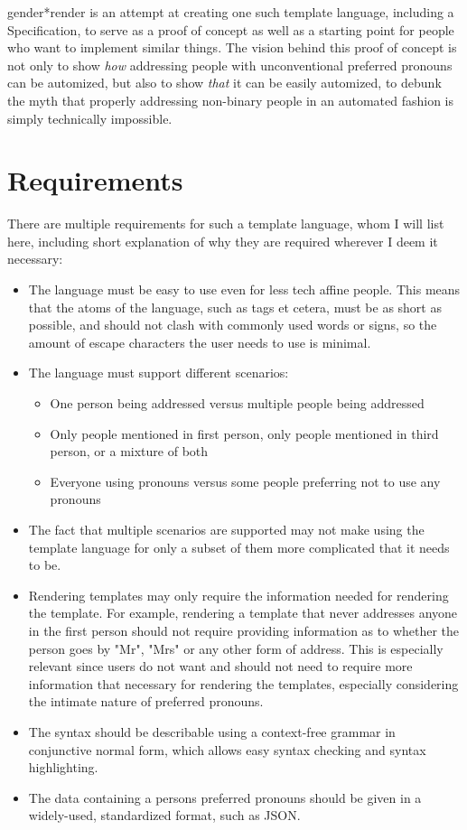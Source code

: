 \documentclass{article}
\newcommand{\GenderRender}{
    gender*render
}
\begin{document}
    \GenderRender is an attempt at creating one such template language, including a Specification, to serve as a proof of concept as well as a starting point for people who want to implement similar things.
    The vision behind this proof of concept is not only to show \emph{how} addressing people with unconventional preferred pronouns can be automized, but also to show \emph{that} it can be easily automized, to debunk the myth that properly addressing non-binary people in an automated fashion is simply technically impossible.

\section{Requirements}

    There are multiple requirements for such a template language, whom I will list here, including short explanation of why they are required wherever I deem it necessary:

    \begin{itemize}
        \item The language must be easy to use even for less tech affine people.
              This means that the atoms of the language, such as tags et cetera, must be as short as possible, and should not clash with commonly used words or signs, so the amount of escape characters the user needs to use is minimal.
        \item The language must support different scenarios:
        \begin{itemize}
            \item One person being addressed versus multiple people being addressed
            \item Only people mentioned in first person, only people mentioned in third person, or a mixture of both
            \item Everyone using pronouns versus some people preferring not to use any pronouns
        \end{itemize}
        \item The fact that multiple scenarios are supported may not make using the template language for only a subset of them more complicated that it needs to be.
        \item Rendering templates may only require the information needed for rendering the template.
        For example, rendering a template that never addresses anyone in the first person should not require providing information as to whether the person goes by "Mr", "Mrs" or any other form of address.
        This is especially relevant since users do not want and should not need to require more information that necessary for rendering the templates, especially considering the intimate nature of preferred pronouns.
        \item The syntax should be describable using a context-free grammar in conjunctive normal form, which allows easy syntax checking and syntax highlighting.
        \item The data containing a persons preferred pronouns should be given in a widely-used, standardized format, such as JSON.
    \end{itemize}
\end{document}
